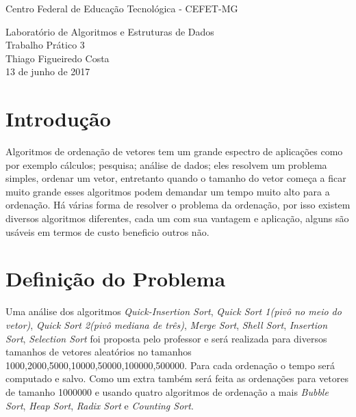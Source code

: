 \documentclass[a4paper, 10pt]{article}
\begin{document}
{\Large \centering Centro Federal de Educação Tecnológica - CEFET-MG\\}
\begin{center}
{\LARGE Laboratório de Algoritmos e Estruturas de Dados\\} 
{\large Trabalho Prático 3\\[7.5cm]}
{\Large Thiago Figueiredo Costa\\ \vfill}
{\Large 13 de junho de 2017}
\end{center}



%	
%	



\newpage
\section{Introdução}
Algoritmos de ordenação de vetores tem um grande espectro de aplicações como por exemplo cálculos; pesquisa; análise de dados; eles resolvem um problema simples, ordenar um vetor, entretanto quando o tamanho do vetor começa a ficar muito grande esses algoritmos podem demandar um tempo muito alto para a ordenação.
Há várias forma de resolver o problema da ordenação, por isso existem diversos algoritmos diferentes, cada um com sua vantagem e aplicação, alguns são usáveis em termos de custo beneficio  outros não.
\section{Definição do Problema}
Uma análise dos algoritmos \textit{Quick-Insertion Sort}, \textit{Quick Sort 1(pivô no meio do vetor)}, \textit{Quick Sort 2(pivô mediana de três)}, \textit{Merge Sort}, \textit{Shell Sort}, \textit{Insertion Sort}, \textit{Selection Sort}  foi proposta pelo professor e será realizada para diversos tamanhos de vetores aleatórios no tamanhos 1000,2000,5000,10000,50000,100000,500000. Para cada ordenação o tempo será computado e salvo.
Como um extra também será feita as ordenações para vetores de tamanho 1000000 e usando quatro algoritmos de ordenação a mais \textit{Bubble Sort}, \textit{Heap Sort}, \textit{Radix Sort} e \textit{Counting Sort}.
\end{document}
